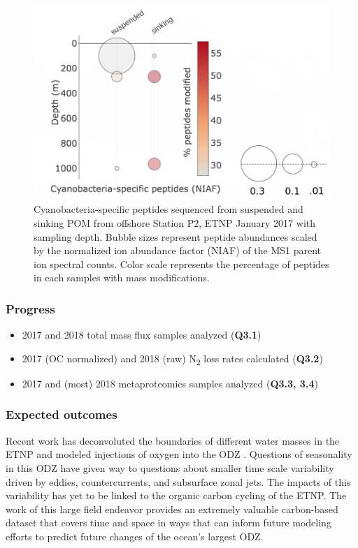 \documentclass[12pt, letterpaper, twoside]{article}
\begin{document}
\begin{figure}
	\includegraphics[width=\linewidth]{etnp2017-cyano-mods.jpg}
	\caption{Cyanobacteria-specific peptides sequenced from suspended and sinking POM from offshore Station P2, ETNP January 2017 with sampling depth. Bubble sizes represent peptide abundances scaled by the normalized ion abundance factor (NIAF) of the MS1 parent ion spectral counts. Color scale represents the percentage of peptides in each samples with mass modifications.}
	\label{fig:cyanomods}
\end{figure}

\subsubsection*{Progress}

\begin{itemize}
	\item 2017 and 2018 total mass flux samples analyzed (\textbf{Q3.1})
	\item 2017 (OC normalized) and 2018 (raw) N\textsubscript{2} loss rates calculated (\textbf{Q3.2})
	\item 2017 and (most) 2018 metaproteomics samples analyzed (\textbf{Q3.3, 3.4})
\end{itemize}


\subsubsection*{Expected outcomes}

Recent work has deconvoluted the boundaries of different water masses in the ETNP \cite{evans_role_nodate} and modeled injections of oxygen into the ODZ \cite{margolskee_ventilation_2019}. Questions of seasonality in this ODZ have given way to questions about smaller time scale variability driven by eddies, countercurrents, and subsurface zonal jets. The impacts of this variability has yet to be linked to the organic carbon cycling of the ETNP. The work of this large field endeavor provides an extremely valuable carbon-based dataset that covers time and space in ways that can inform future modeling efforts to predict future changes of the ocean's largest ODZ. 
\end{document}
